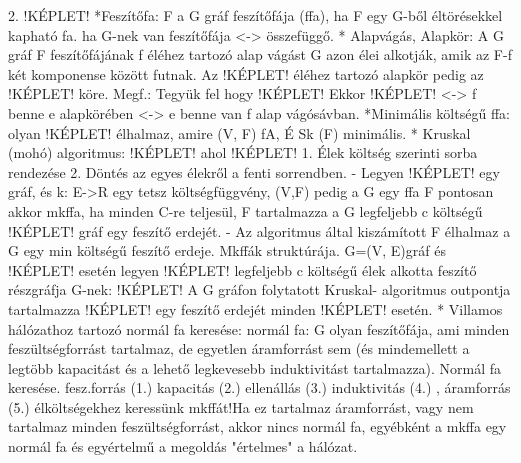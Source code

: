 \documentclass[../../szobeli.tex]{subfiles}
\begin{document}
\begin{center}
    \noindent{}
\end{center}

    2.
    !KÉPLET!
    *Feszítőfa: F a G gráf feszítőfája (ffa), ha F egy G-ből éltörésekkel kapható fa. ha G-nek van feszítőfája <-> összefüggő.
    * Alapvágás, Alapkör: A G gráf F feszítőfájának f éléhez tartozó alap vágást G azon élei alkotják, amik az F-f két komponense között futnak. Az !KÉPLET!  éléhez tartozó alapkör pedig az !KÉPLET!  köre. Megf.: Tegyük fel hogy !KÉPLET!  Ekkor !KÉPLET!  <-> f benne e alapkörében <-> e benne van f alap vágósávban.
    *Minimális költségű ffa: olyan !KÉPLET!  élhalmaz, amire (V, F) fA, É Sk (F) minimális.
    * Kruskal (mohó) algoritmus: !KÉPLET! ahol !KÉPLET!  1. Élek költség szerinti sorba rendezése 2. Döntés az egyes élekről a fenti sorrendben. - Legyen !KÉPLET!  egy gráf, és k: E->R egy tetsz költségfüggvény, (V,F) pedig a G egy ffa F pontosan akkor mkffa, ha minden C-re teljesül, F tartalmazza a G legfeljebb c költségű !KÉPLET! gráf egy feszítő erdejét. - Az algoritmus által kiszámított F élhalmaz a G egy min költségű feszítő erdeje.
    Mkffák struktúrája. G=(V, E)gráf és !KÉPLET!  esetén legyen !KÉPLET!  legfeljebb c költségű élek alkotta feszítő részgráfja G-nek: !KÉPLET! A G gráfon folytatott Kruskal- algoritmus outpontja tartalmazza !KÉPLET!  egy feszítő erdejét minden !KÉPLET!  esetén.
    * Villamos hálózathoz tartozó normál fa keresése: normál fa: G olyan feszítőfája, ami minden feszültségforrást tartalmaz, de egyetlen áramforrást sem (és mindemellett a legtöbb kapacitást és a lehető legkevesebb induktivitást tartalmazza). Normál fa keresése. fesz.forrás (1.) kapacitás (2.) ellenállás (3.) induktivitás (4.) , áramforrás (5.) élköltségekhez keressünk mkffát!Ha ez tartalmaz áramforrást, vagy nem tartalmaz minden feszültségforrást, akkor nincs normál fa, egyébként a mkffa egy normál fa és egyértelmű a megoldás "értelmes" a hálózat.
\end{document}
